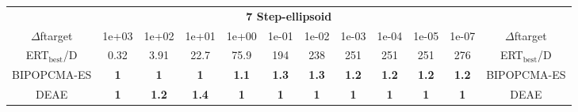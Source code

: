 \begin{tabular}{cccccccccccc}
 & \multicolumn{10}{c}{{\normalsize \textbf{7 Step-ellipsoid}}}\\
$\Delta$ftarget& 1e+03& 1e+02& 1e+01& 1e+00& 1e-01& 1e-02& 1e-03& 1e-04& 1e-05& 1e-07 & $\Delta$ftarget \\
ERT$_{\textrm{best}}$/D& 0.32& 3.91& 22.7& 75.9& 194& 238& 251& 251& 251& 276 & ERT$_{\textrm{best}}$/D \\
\hline
BIPOPCMA-ES & \textbf{1} & \textbf{1} & \textbf{1} & \textbf{1.1} & \textbf{1.3} & \textbf{1.3} & \textbf{1.2} & \textbf{1.2} & \textbf{1.2} & \textbf{1.2} & BIPOPCMA-ES \cite{add_an_entry_for_BIPOPCMA-ES_in_bbob.bib}\\
DEAE & \textbf{1} & \textbf{1.2} & \textbf{1.4} & \textbf{1} & \textbf{1} & \textbf{1} & \textbf{1} & \textbf{1} & \textbf{1} & \textbf{1} & DEAE \cite{add_an_entry_for_DEAE_in_bbob.bib}
\end{tabular}

